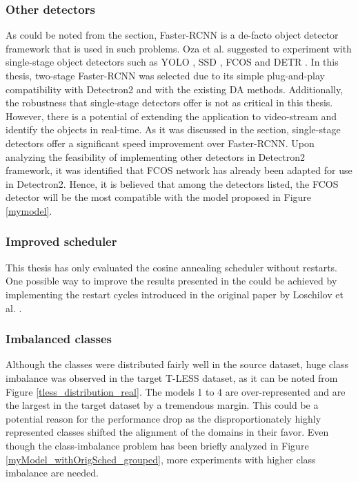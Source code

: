 \subsubsection{Other detectors}
As could be noted from the  section, Faster-RCNN is a de-facto object detector framework that is used in such problems. Oza et al. \cite{Oza2021} suggested to experiment with single-stage object detectors such as YOLO \cite{Redmon2015a}, SSD \cite{Liu2015}, FCOS \cite{Tian2019} and DETR \cite{Carion2020}. In this thesis, two-stage Faster-RCNN was selected due to its simple plug-and-play compatibility with Detectron2 \cite{wu2019Detectron2} and with the existing DA methods. Additionally, the robustness that single-stage detectors offer is not as critical in this thesis. However, there is a potential of extending the application to video-stream and identify the objects in real-time. As it was discussed in the  section, single-stage detectors offer a significant speed improvement over Faster-RCNN. Upon analyzing the feasibility of implementing other detectors in Detectron2 \cite{wu2019Detectron2} framework, it was identified that FCOS network has already been adapted for use in Detectron2. Hence, it is believed that among the detectors listed, the FCOS detector will be the most compatible with the model proposed in Figure \ref{mymodel}. 


\subsubsection{Improved scheduler}
This thesis has only evaluated the cosine annealing scheduler without restarts. One possible way to improve the results presented in the  could be achieved by implementing the restart cycles introduced in the original paper by Loschilov et al. \cite{Loshchilov2016}.   


\subsubsection{Imbalanced classes}
Although the classes were distributed fairly well in the source dataset, huge class imbalance was observed in the target T-LESS dataset, as it can be noted from Figure \ref{tless_distribution_real}. The models 1 to 4 are over-represented and are the largest in the target dataset by a tremendous margin. This could be a potential reason for the performance drop as the disproportionately highly represented classes shifted the alignment of the domains in their favor. Even though the class-imbalance problem has been briefly analyzed in Figure \ref{myModel_withOrigSched_grouped}, more experiments with higher class imbalance are needed.

